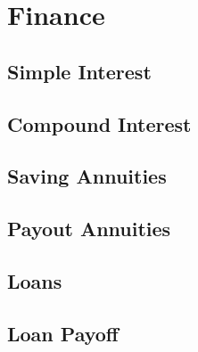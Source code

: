 \chapter{Finance}%
\label{chap:finance}

\section{Simple Interest}%
\label{sec:simple-interest}

\section{Compound Interest}%
\label{sec:compound-interest}

\section{Saving Annuities}%
\label{sec:annuities}


\section{Payout Annuities}%
\label{sec:payout-annuities}

\section{Loans}%
\label{sec:loans}

\section{Loan Payoff}%
\label{sec:loan-payoff}







